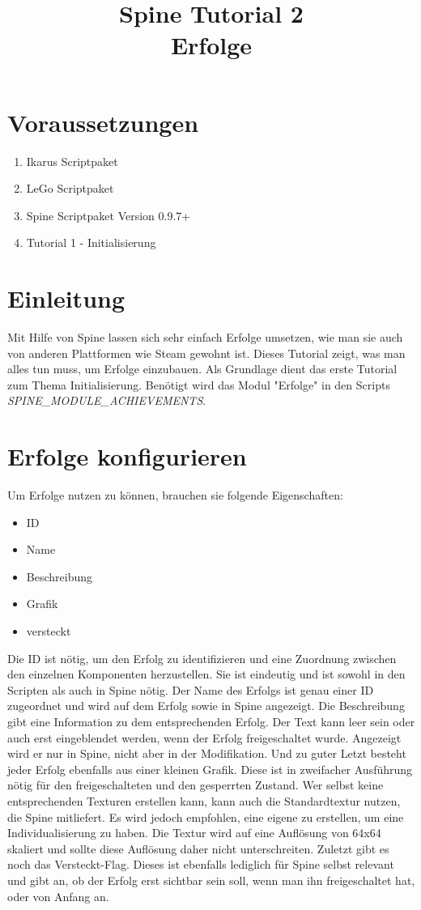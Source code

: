 \documentclass{article}
\title{Spine Tutorial 2 \\ Erfolge}
\begin{document}
\section{Voraussetzungen}

\begin{enumerate}
\item Ikarus Scriptpaket
\item LeGo Scriptpaket
\item Spine Scriptpaket Version 0.9.7+
\item Tutorial 1 - Initialisierung
\end{enumerate}

\section{Einleitung}

Mit Hilfe von Spine lassen sich sehr einfach Erfolge umsetzen, wie man sie auch von anderen Plattformen wie Steam gewohnt ist. Dieses Tutorial zeigt, was man alles tun muss, um Erfolge einzubauen. Als Grundlage dient das erste Tutorial zum Thema Initialisierung. Benötigt wird das Modul "Erfolge" in den Scripts \textit{SPINE\_MODULE\_ACHIEVEMENTS}.

\section{Erfolge konfigurieren}

Um Erfolge nutzen zu können, brauchen sie folgende Eigenschaften:

\begin{itemize}
	\item ID
	\item Name
	\item Beschreibung
	\item Grafik
	\item versteckt
\end{itemize}

Die ID ist nötig, um den Erfolg zu identifizieren und eine Zuordnung zwischen den einzelnen Komponenten herzustellen. Sie ist eindeutig und ist sowohl in den Scripten als auch in Spine nötig. Der Name des Erfolgs ist genau einer ID zugeordnet und wird auf dem Erfolg sowie in Spine angezeigt. Die Beschreibung gibt eine Information zu dem entsprechenden Erfolg. Der Text kann leer sein oder auch erst eingeblendet werden, wenn der Erfolg freigeschaltet wurde. Angezeigt wird er nur in Spine, nicht aber in der Modifikation. Und zu guter Letzt besteht jeder Erfolg ebenfalls aus einer kleinen Grafik. Diese ist in zweifacher Ausführung nötig für den freigeschalteten und den gesperrten Zustand. Wer selbst keine entsprechenden Texturen erstellen kann, kann auch die Standardtextur nutzen, die Spine mitliefert. Es wird jedoch empfohlen, eine eigene zu erstellen, um eine Individualisierung zu haben. Die Textur wird auf eine Auflösung von 64x64 skaliert und sollte diese Auflösung daher nicht unterschreiten. Zuletzt gibt es noch das Versteckt-Flag. Dieses ist ebenfalls lediglich für Spine selbst relevant und gibt an, ob der Erfolg erst sichtbar sein soll, wenn man ihn freigeschaltet hat, oder von Anfang an.\\
\end{document}
